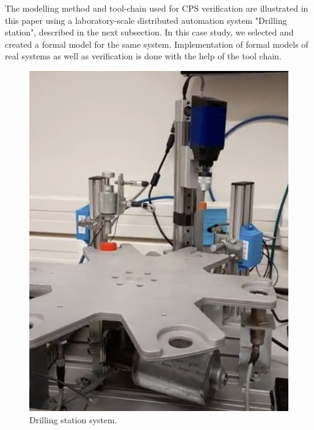 \begin{bibunit}
The modelling method and tool-chain used for CPS verification are illustrated in this paper using a laboratory-scale distributed automation system "Drilling station", described in the next subsection. In this case study, we selected and created a formal model for the same system. Implementation of formal models of real systems as well as verification is done with the help of the tool chain. 



\begin{figure}
    \centering
    \includegraphics[scale = 0.2]{MX_Papers/Paper2/images/DT_REAL.png}
    \caption{Drilling station system.}
    \label{figure:RealImageofDrillTable}
\end{figure}


\end{bibunit}
